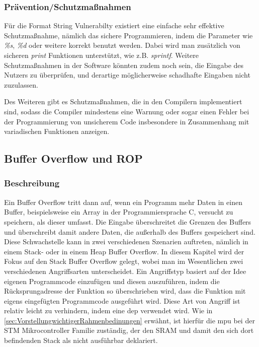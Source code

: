 \documentclass[a4paper,
DIV=13,
12pt,
BCOR=10mm,
department=FakIM,
oneside,
parskip=half,
automark,
listof=totocnumbered,
bibliography=totocnumbered,
acronym=totocnumbered
] {OTHRartcl}
\begin{document}
\subsubsection{Prävention/Schutzmaßnahmen}
Für die Format String Vulnerabilty existiert eine einfache sehr effektive Schutzmaßnahme, nämlich
das sichere Programmieren, indem die Parameter wie \textit{\%s}, \textit{\%d} oder weitere korrekt benutzt werden.
Dabei wird man zusätzlich von sicheren \textit{print} Funktionen unterstützt, wie z.B. \textit{sprintf}.
Weitere Schutzmaßnahmen in der Software könnten zudem noch sein, die Eingabe des Nutzers zu überprüfen, und
derartige möglicherweise schadhafte Eingaben nicht zuzulassen.

Des Weiteren gibt es Schutzmaßnahmen, die in den Compilern implementiert sind, sodass die Compiler mindestens eine Warnung oder sogar einen Fehler
bei der Programmierung von unsicherem Code insbesondere in Zusammenhang mit variadischen Funktionen anzeigen. \cite{OWASP Format String Vuln.}

\subsection{Buffer Overflow und ROP}
\subsubsection{Beschreibung}
Ein Buffer Overflow tritt dann auf, wenn ein Programm mehr Daten in einen Buffer, beispielsweise ein Array in der Programmiersprache C, versucht zu speichern, als
dieser umfasst. \cite{OWASP Buffer Overflow}
Die Eingabe überschreitet die Grenzen des Buffers und überschreibt damit andere Daten, die außerhalb des Buffers gespeichert sind.
Diese Schwachstelle kann in zwei verschiedenen Szenarien auftreten, nämlich in einem Stack- oder in einem Heap Buffer Overflow.
In diesem Kapitel wird der Fokus auf den Stack Buffer Overflow gelegt, wobei man im Wesentlichen zwei verschiedenen Angriffsarten unterscheidet.
Ein Angriffstyp basiert auf der Idee eigenen Programmcode einzufügen und diesen auszuführen, indem die Rücksprungadresse der Funktion so überschrieben wird, dass die Funktion
mit eigens eingefügten Programmcode ausgeführt wird. Diese Art von Angriff ist relativ leicht zu verhindern, indem eine \ac{dep} verwendet wird. \cite{IEEE Xplore ROP}
Wie in \autoref{sec:VorstellungwichtigerRahmenbedinungen} erwähnt, ist hierfür die \ac{mpu} bei der STM Mikrocontroller Familie zuständig, der den SRAM und damit den sich dort befindenden Stack als nicht ausführbar deklariert.
\end{document}
